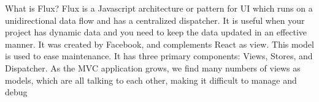 What is Flux?
Flux is a Javascript architecture or pattern for UI which runs on a 
unidirectional data flow and has a centralized dispatcher. It is useful 
when your project has dynamic data and you need to keep the data updated 
in an effective manner. It was created by Facebook, and complements React 
as view. This model is used to ease maintenance. It has three primary components: 
Views, Stores, and Dispatcher. As the MVC application grows, we find many 
numbers of views as models, which are all talking to each other, making it 
difficult to manage and debug
